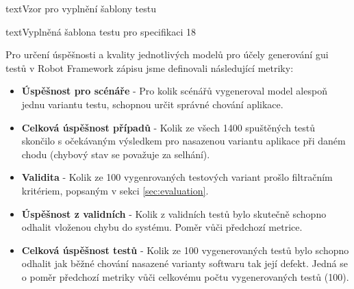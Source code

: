 \documentclass[czech, ma, kiv, he, iso690numb, pdf, viewonly]{fasthesis}
\begin{document}
\begin{code}{text}{Vzor pro vyplnění šablony testu \label{lst:template}}
{\begin{code}{text}{Vyplněná šablona testu pro specifikaci 18 \label{lst:spec18}}
{        Pro určení úspěšnosti a kvality jednotlivých modelů pro účely generování \Acrshort{gui} testů v Robot Framework zápisu jsme definovali následující metriky: 
        \begin{itemize}
            \item \textbf{Úspěšnost pro scénáře} - Pro kolik scénářů vygeneroval model alespoň jednu variantu testu, schopnou určit správné chování aplikace.
            \item \textbf{Celková úspěšnost případů} - Kolik ze všech 1400 spuštěných testů skončilo s očekávaným výsledkem pro nasazenou variantu aplikace při daném chodu (chybový stav se považuje za selhání).
            \item \textbf{Validita} - Kolik ze 100 vygenrovaných testových variant prošlo filtračním kritériem, popsaným v sekci \ref{sec:evaluation}. 
            \item \textbf{Úspěšnost z validních} - Kolik z validních testů bylo skutečně schopno odhalit vloženou chybu do systému. Poměr vůči předchozí metrice.
            \item \textbf{Celková úspěšnost testů} - Kolik ze 100 vygenerovaných testů bylo schopno odhalit jak běžné chování nasazené varianty softwaru tak její defekt. Jedná se o poměr předchozí metriky vůči celkovému počtu vygenerovaných testů (100).
        \end{itemize}

}
\end{code}}
\end{code}
\end{document}
